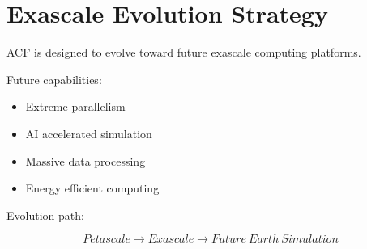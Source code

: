\section{Exascale Evolution Strategy}


ACF is designed to evolve toward future exascale computing
platforms.



Future capabilities:


\begin{itemize}

\item Extreme parallelism

\item AI accelerated simulation

\item Massive data processing

\item Energy efficient computing

\end{itemize}



Evolution path:


\[
Petascale
\rightarrow
Exascale
\rightarrow
Future\ Earth\ Simulation
\]

